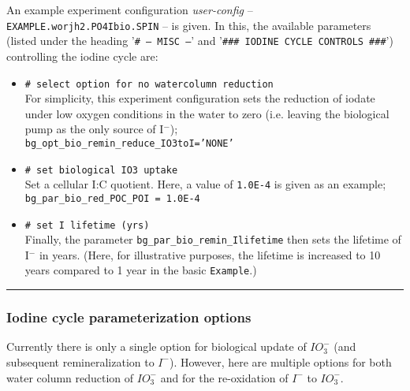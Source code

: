 An example experiment configuration \textit{user-config} -- \texttt{EXAMPLE.worjh2.PO4Ibio.SPIN} -- is given. In this, the available parameters (listed under the heading '\texttt{\# --- MISC ---}' and '\texttt{\#\#\# IODINE CYCLE CONTROLS \#\#\#}') controlling the iodine cycle are:

\begin{itemize}[noitemsep]

\vspace{1mm}
        \item \texttt{\# select option for no watercolumn reduction}
        \\ For simplicity, this experiment configuration sets the reduction of iodate under low oxygen conditions in the water to zero (i.e. leaving the biological pump as the only source of I\(^{-}\));
\\ \texttt{bg\_opt\_bio\_remin\_reduce\_IO3toI='NONE'}

\vspace{1mm}
        \item \texttt{\# set biological IO3 uptake}
        \\ Set a cellular I:C quotient. Here, a value of \texttt{1.0E-4} is given as an example;
\\ \texttt{bg\_par\_bio\_red\_POC\_POI = 1.0E-4}

\vspace{1mm}
        \item \texttt{\# set I lifetime (yrs)}
        \\ Finally, the parameter \texttt{bg\_par\_bio\_remin\_Ilifetime} then sets the lifetime of I\(^{-}\) in years. (Here, for illustrative purposes, the lifetime is increased to 10 years compared to 1 year in the basic \texttt{Example}.)

\end{itemize}
\vspace{1mm}

%
\noindent\rule{4cm}{0.5pt}
\subsubsection{Iodine cycle parameterization options}
\vspace{1mm}

Currently there is only a single option for biological update of \(IO^{-}_{3}\) (and subsequent remineralization to \(I^{-}\)). However, here are multiple options for both water column reduction of \(IO^{-}_{3}\) and for the re-oxidation of \(I^{-}\) to \(IO^{-}_{3}\).

